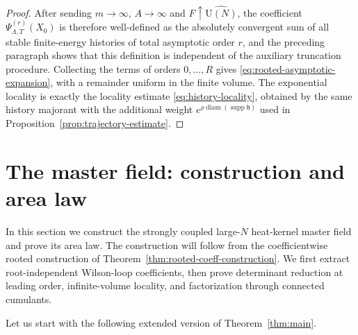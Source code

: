 \documentclass[11pt,a4paper,reqno]{amsart}
\theoremstyle{definition}
\theoremstyle{remark}
\newcommand\U{{\mathrm U}}
\begin{document}
\begin{proof}
After sending $m\to\infty$, $A\to\infty$ and $F\uparrow\widehat{\U(N)}$, the coefficient $\Psi^{(r)}_{\Lambda,T}(X_0)$ is therefore well-defined as the absolutely convergent sum of all stable finite-energy histories of total asymptotic order $r$, and the preceding paragraph shows that this definition is independent of the auxiliary truncation procedure.  Collecting the terms of orders $0,\ldots,R$ gives \eqref{eq:rooted-asymptotic-expansion}, with a remainder uniform in the finite volume.  The exponential locality is exactly the locality estimate \eqref{eq:history-locality}, obtained by the same history majorant with the additional weight $e^{\rho\operatorname{diam}(\operatorname{supp}\mathfrak h)}$ used in Proposition~\ref{prop:trajectory-estimate}.
\end{proof}

\section{The master field: construction and area law}\label{sec:master-field}

In this section we construct the strongly coupled large-$N$ heat-kernel master field and prove its area law. The construction will follow from the coefficientwise rooted construction of Theorem~\ref{thm:rooted-coeff-construction}.  We first extract root-independent Wilson-loop coefficients, then prove determinant reduction at leading order, infinite-volume locality, and factorization through connected cumulants.

Let us start with the following extended version of Theorem~\ref{thm:main}.
\end{document}

